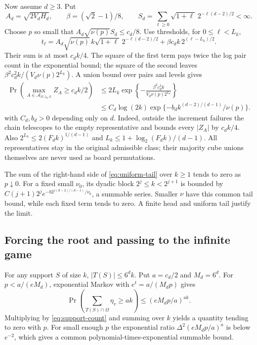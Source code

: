 \documentclass[11pt,a4paper]{article}
\numberwithin{equation}{section}
\begin{document}
Now assume $d\ge3$. Put
\[
 A_d=\sqrt{2V_dH_d},\qquad
 \beta=(\sqrt2-1)/8,\qquad
 S_d=\sum_{\ell\ge0}\sqrt{1+\ell}\,2^{-\ell(d-2)/2}<\infty.
\]
Choose $p$ so small that $A_d\sqrt{\nu(p)}S_d\le c_d/8$.
Use thresholds, for $0\le\ell<L_k$,
\[
 t_\ell=A_d\sqrt{\nu(p)}\,k\sqrt{1+\ell}\,2^{-\ell(d-2)/2}
             +\beta c_dk\,2^{(\ell-L_k)/2}.
\]
Their sum is at most $c_dk/4$. The square of the first term pays twice
the log pair count in the exponential bound; the square of the second
leaves $\beta^2c_d^2k/(V_d\nu(p)2^{L_k})$.
A union bound over pairs and levels gives
\begin{equation}\label{eq:uniform-tail}
 \begin{aligned}
 \Pr\left(\max_{A\in\mathcal A_{\Omega,z_0,k}}Z_A\ge c_dk/2\right)
 &\le2L_k\exp\left\{-\frac{\beta^2c_d^2k}
                         {V_d\nu(p)2^{L_k}}\right\}\\
 &\le C_d\log(2k)\exp\{-b_dk^{(d-2)/(d-1)}/\nu(p)\}.
 \end{aligned}
\end{equation}
with $C_d,b_d>0$ depending only on $d$.
Indeed, outside the increment failures the chain telescopes to the empty
representative and bounds every $|Z_A|$ by $c_dk/4$.
Also $2^{L_k}\le2(F_dk)^{1/(d-1)}$ and
$L_k\le1+\log_2(F_dk)/(d-1)$.
All representatives stay in the original admissible class; their majority
cube unions themselves are never used as board permutations.

The sum of the right-hand side of \eqref{eq:uniform-tail} over $k\ge1$
tends to zero as $p\downarrow0$.
For a fixed small $\nu_0$, its dyadic block $2^j\le k<2^{j+1}$ is
bounded by $C(j+1)2^j e^{-b2^{j(d-2)/(d-1)}/\nu_0}$, a summable series.
Smaller $\nu$ have this common tail bound, while each fixed term tends
to zero. A finite head and uniform tail justify the limit.

\subsection{Forcing the root and passing to the infinite game}
For any support $S$ of size $k$,
$|T(S)|\le6^dk$. Put $a=c_d/2$ and $M_d=6^d$.
For $p<a/(eM_d)$, exponential Markov with
$e^t=a/(M_dp)$ gives
\[
 \Pr\left(\sum_{T(S)\cap\Omega}\eta_v\ge ak\right)
 \le(eM_dp/a)^{ak}.
\]
Multiplying by \eqref{eq:support-count} and summing over $k$ yields a
quantity tending to zero with $p$. For small enough $p$ the exponential
ratio $\Delta^2(eM_dp/a)^a$ is below $e^{-2}$, which gives a common
polynomial-times-exponential summable bound.
\end{document}
